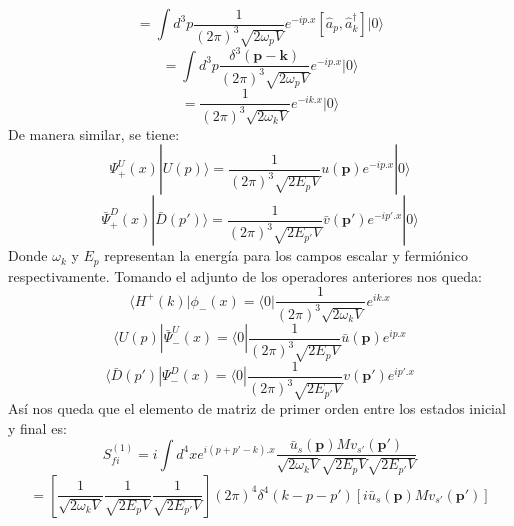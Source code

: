 \[
 =\int d^3p \frac{1}{(2\pi)^3\sqrt{2\omega_p V}} e^{-ip.x}[\hat{a}_p,\hat{a}^{\dagger}_k]|0\rangle
\]
\[
 =\int d^3p \frac{\delta^3(\mathbf{p}-\mathbf{k})}{(2\pi)^3\sqrt{2\omega_p V}} e^{-ip.x}|0\rangle
\]
\[
 =\frac{1}{(2\pi)^3\sqrt{2\omega_k V}}e^{-ik.x}|0\rangle
\]
De manera similar, se tiene:
\[
 \Psi_{+}^{U}(x)|U(p)\rangle=\frac{1}{(2\pi)^3\sqrt{2E_p V}}u(\mathbf{p})e^{-ip.x}|0\rangle
\]
\[
 \bar{\Psi}_{+}^{D}(x)|\bar{D}(p')\rangle=\frac{1}{(2\pi)^3\sqrt{2E_{p'} V}}\bar{v}(\mathbf{p'})e^{-ip'.x}|0\rangle
\]
Donde $\omega_k$ y $E_p$ representan la energía para los campos escalar y fermiónico respectivamente. Tomando el adjunto de 
los operadores anteriores nos queda:
\[
\langle H^{+}(k)|\phi_{-}(x)=\langle 0|\frac{1}{(2\pi)^3\sqrt{2\omega_k V}}e^{ik.x}
\]
\[
 \langle U(p)|\bar{\Psi}_{-}^{U}(x)=\langle 0|\frac{1}{(2\pi)^3\sqrt{2E_p V}}\bar{u}(\mathbf{p})e^{ip.x}
\]
\[
 \langle\bar{D}(p')|\Psi_{-}^{D}(x)=\langle 0 |\frac{1}{(2\pi)^3\sqrt{2E_{p'} V}}v(\mathbf{p'})e^{ip'.x}
\]
Así nos queda que el elemento de matriz de primer orden entre los estados inicial y final es:
\[
 S^{(1)}_{fi}=i \int d^4x e^{i(p+p'-k).x}\frac{\bar{u}_s(\mathbf{p})M v_{s'}(\mathbf{p'})}{\sqrt{2\omega_k V}\sqrt{2E_p V}\sqrt{2E_{p'} V}}
\]
\begin{equation}
=\left[\frac{1}{\sqrt{2\omega_k V}}\frac{1}{\sqrt{2E_p V}}\frac{1}{\sqrt{2E_{p'}V}} \right](2\pi)^4 \delta^4(k-p-p')[i\bar{u}_s (\mathbf{p})Mv_{s'} (\mathbf{p'})]
\end{equation}


